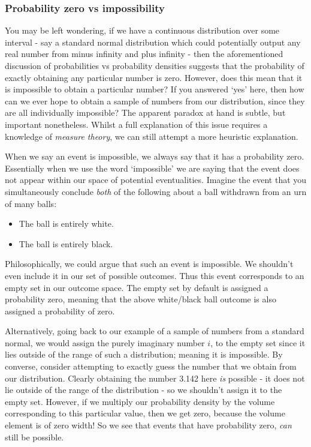 \documentclass[11pt,fullpage]{book}
\begin{document}
\subsubsection{Probability zero vs impossibility}
You may be left wondering, if we have a continuous distribution over some interval - say a standard normal distribution which could potentially output any real number from minus infinity and plus infinity - then the aforementioned discussion of probabilities vs probability densities suggests that the probability of exactly obtaining any particular number is zero. However, does this mean that it is impossible to obtain a particular number? If you answered `yes' here, then how can we ever hope to obtain a sample of numbers from our distribution, since they are all individually impossible? The apparent paradox at hand is subtle, but important nonetheless. Whilst a full explanation of this issue requires a knowledge of \textit{measure theory}, we can still attempt a more heuristic explanation.

When we say an event is impossible, we always say that it has a probability zero. Essentially when we use the word `impossible' we are saying that the event does not appear within our space of potential eventualities. Imagine the event that you simultaneously conclude \textit{both} of the following about a ball withdrawn from an urn of many balls:

\begin{itemize}
\item The ball is entirely white.
\item The ball is entirely black.
\end{itemize} 

Philosophically, we could argue that such an event is impossible. We shouldn't even include it in our set of possible outcomes. Thus this event corresponds to an empty set in our outcome space. The empty set by default is assigned a probability zero, meaning that the above white/black ball outcome is also assigned a probability of zero.

Alternatively, going back to our example of a sample of numbers from a standard normal, we would assign the purely imaginary number $i$, to the empty set since it lies outside of the range of such a distribution; meaning it is impossible. By converse, consider attempting to exactly guess the number that we obtain from our distribution. Clearly obtaining the number 3.142 here \textit{is} possible - it does not lie outside of the range of the distribution - so we shouldn't assign it to the empty set. However, if we multiply our probability density by the volume corresponding to this particular value, then we get zero, because the volume element is of zero width! So we see that events that have probability zero, \textit{can} still be possible. 
\end{document}
